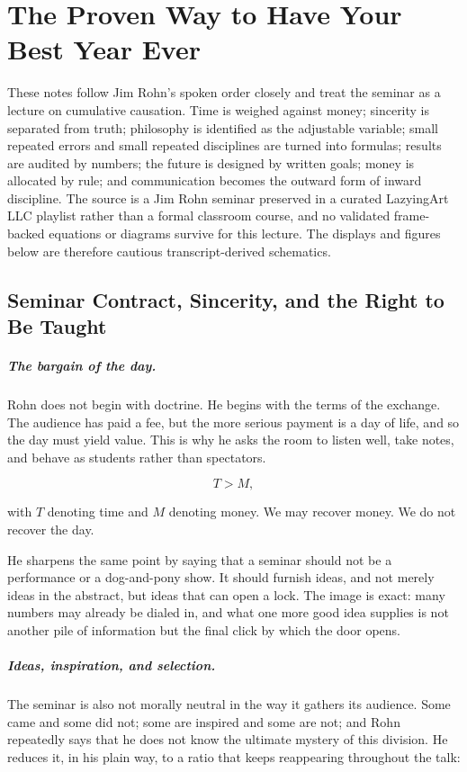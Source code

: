 \chapter{The Proven Way to Have Your Best Year Ever}

These notes follow Jim Rohn's spoken order closely and treat the seminar as a lecture on cumulative causation. Time is weighed against money; sincerity is separated from truth; philosophy is identified as the adjustable variable; small repeated errors and small repeated disciplines are turned into formulas; results are audited by numbers; the future is designed by written goals; money is allocated by rule; and communication becomes the outward form of inward discipline. The source is a Jim Rohn seminar preserved in a curated LazyingArt LLC playlist rather than a formal classroom course, and no validated frame-backed equations or diagrams survive for this lecture. The displays and figures below are therefore cautious transcript-derived schematics.

\section{Seminar Contract, Sincerity, and the Right to Be Taught}

\paragraph{The bargain of the day.}
Rohn does not begin with doctrine. He begins with the terms of the exchange. The audience has paid a fee, but the more serious payment is a day of life, and so the day must yield value. This is why he asks the room to listen well, take notes, and behave as students rather than spectators.

\begin{equation}
T > M,
\end{equation}

with \(T\) denoting time and \(M\) denoting money. We may recover money. We do not recover the day.

He sharpens the same point by saying that a seminar should not be a performance or a dog-and-pony show. It should furnish ideas, and not merely ideas in the abstract, but ideas that can open a lock. The image is exact: many numbers may already be dialed in, and what one more good idea supplies is not another pile of information but the final click by which the door opens.

\paragraph{Ideas, inspiration, and selection.}
The seminar is also not morally neutral in the way it gathers its audience. Some came and some did not; some are inspired and some are not; and Rohn repeatedly says that he does not know the ultimate mystery of this division. He reduces it, in his plain way, to a ratio that keeps reappearing throughout the talk:

